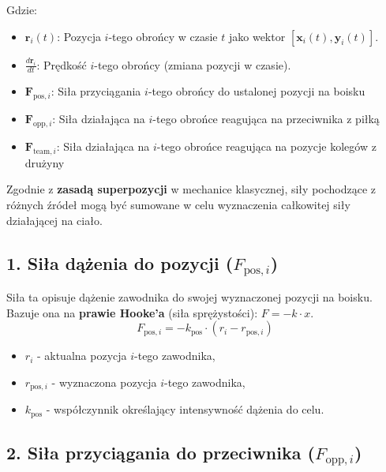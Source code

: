 \documentclass{article}
\begin{document}
Gdzie:
\begin{itemize}
    \item \(\mathbf{r}_i(t)\): Pozycja \(i\)-tego obrońcy w czasie \(t\) jako wektor \([\mathbf{x}_i(t), \mathbf{y}_i(t)]\).
    \item \(\frac{d\mathbf{r}_i}{dt}\): Prędkość \(i\)-tego obrońcy (zmiana pozycji w czasie).
    \item \(\mathbf{F}_{\text{pos},i}\): Siła przyciągania \(i\)-tego obrońcy do ustalonej pozycji na boisku
    \item \(\mathbf{F}_{\text{opp},i}\): Siła działająca na \(i\)-tego obrońce reagująca na przeciwnika z piłką
    \item \(\mathbf{F}_{\text{team},i}\): Siła działająca na \(i\)-tego obrońce reagująca na pozycje kolegów z drużyny
\end{itemize}
Zgodnie z \textbf{zasadą superpozycji} w mechanice klasycznej, siły pochodzące z różnych źródeł mogą być sumowane w celu wyznaczenia całkowitej siły działającej na ciało.

\subsection*{1. Siła dążenia do pozycji (\(F_{\text{pos}, i}\))}

Siła ta opisuje dążenie zawodnika do swojej wyznaczonej pozycji na boisku. Bazuje ona na \textbf{prawie Hooke’a} (siła sprężystości): \(F = -k \cdot x\).
\[
F_{\text{pos}, i} = -k_{\text{pos}} \cdot (r_i - r_{\text{pos}, i})
\]
\begin{itemize}
    \item \(r_i\) - aktualna pozycja \(i\)-tego zawodnika,
    \item \(r_{\text{pos}, i}\) - wyznaczona pozycja \(i\)-tego zawodnika,
    \item \(k_{\text{pos}}\) - współczynnik określający intensywność dążenia do celu.
\end{itemize}

\subsection*{2. Siła przyciągania do przeciwnika (\(F_{\text{opp}, i}\))}
\end{document}
